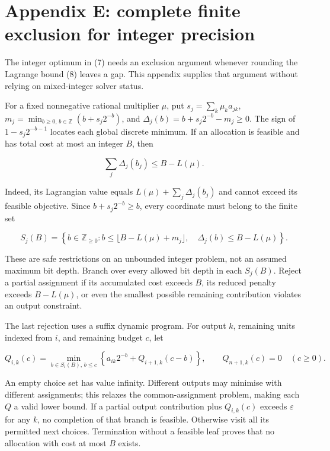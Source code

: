 \documentclass[
  british,
  11pt,
  a4paper,
]{article}
\begin{document}
\section{Appendix E: complete finite exclusion for integer
precision}\label{appendix-e-complete-finite-exclusion-for-integer-precision}

The integer optimum in (7) needs an exclusion argument whenever rounding
the Lagrange bound (8) leaves a gap. This appendix supplies that
argument without relying on mixed-integer solver status.

For a fixed nonnegative rational multiplier \(\mu\), put
\(s_j=\sum_k\mu_ka_{jk}\),
\(m_j=\min_{b\ge0,\,b\in\mathbb Z}(b+s_j2^{-b})\), and
\(\Delta_j(b)=b+s_j2^{-b}-m_j\ge0\). The sign of \(1-s_j2^{-b-1}\)
locates each global discrete minimum. If an allocation is feasible and
has total cost at most an integer \(B\), then

\[\sum_j\Delta_j(b_j)\le B-L(\mu).\]

Indeed, its Lagrangian value equals \(L(\mu)+\sum_j\Delta_j(b_j)\) and
cannot exceed its feasible objective. Since \(b+s_j2^{-b}\ge b\), every
coordinate must belong to the finite set

\[S_j(B)=\left\{b\in\mathbb Z_{\ge0}: b\le\lfloor B-L(\mu)+m_j\rfloor,\quad\Delta_j(b)\le B-L(\mu)\right\}.\]

These are safe restrictions on an unbounded integer problem, not an
assumed maximum bit depth. Branch over every allowed bit depth in each
\(S_j(B)\). Reject a partial assignment if its accumulated cost exceeds
\(B\), its reduced penalty exceeds \(B-L(\mu)\), or even the smallest
possible remaining contribution violates an output constraint.

The last rejection uses a suffix dynamic program. For output \(k\),
remaining units indexed from \(i\), and remaining budget \(c\), let

\[Q_{i,k}(c)=\min_{b\in S_i(B),\,b\le c}\left\{a_{ik}2^{-b}+Q_{i+1,k}(c-b)\right\},\qquad Q_{n+1,k}(c)=0\quad(c\ge0).\]

An empty choice set has value infinity. Different outputs may minimise
with different assignments; this relaxes the common-assignment problem,
making each \(Q\) a valid lower bound. If a partial output contribution
plus \(Q_{i,k}(c)\) exceeds \(\varepsilon\) for any \(k\), no completion
of that branch is feasible. Otherwise visit all its permitted next
choices. Termination without a feasible leaf proves that no allocation
with cost at most \(B\) exists.
\end{document}
